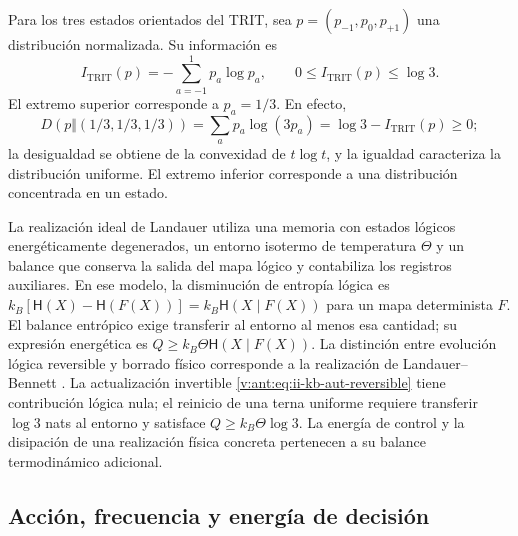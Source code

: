 Para los tres estados orientados del TRIT, sea
\(p=(p_{-1},p_0,p_{+1})\) una distribución normalizada. Su información es
\begin{equation}
 I_{\mathrm{TRIT}}(p)=-\sum_{a=-1}^{1}p_a\log p_a,
 \qquad 0\leq I_{\mathrm{TRIT}}(p)\leq\log3.
 \label{v:ant:eq:ii-kb-aut-trit}
\end{equation}
El extremo superior corresponde a \(p_a=1/3\). En efecto,
\[
 D(p\Vert(1/3,1/3,1/3))
 =\sum_ap_a\log(3p_a)=\log3-I_{\mathrm{TRIT}}(p)\geq0;
\]
la desigualdad se obtiene de la convexidad de \(t\log t\), y la
igualdad caracteriza la distribución uniforme. El extremo inferior
corresponde a una distribución concentrada en un estado.

La realización ideal de Landauer utiliza una memoria con estados lógicos
energéticamente degenerados, un entorno isotermo de temperatura \(\Theta\)
y un balance que conserva la salida del mapa lógico y contabiliza los
registros auxiliares. En ese modelo, la disminución de entropía lógica es
\(k_B[\mathsf H(X)-\mathsf H(F(X))]
=k_B\mathsf H(X\mid F(X))\) para un mapa determinista \(F\).
El balance entrópico exige transferir al entorno al menos esa cantidad;
su expresión energética es \(Q\geq k_B\Theta\mathsf H(X\mid F(X))\).
La distinción entre evolución lógica reversible y borrado físico
corresponde a la realización de Landauer--Bennett \cite{bennett2003}.
La actualización invertible
\eqref{v:ant:eq:ii-kb-aut-reversible} tiene contribución lógica nula; el
reinicio de una terna uniforme requiere transferir \(\log3\) nats
al entorno y satisface \(Q\geq k_B\Theta\log3\).
La energía de control y la disipación de una realización física
concreta pertenecen a su balance termodinámico adicional.

\subsection{Acción, frecuencia y energía de decisión}

